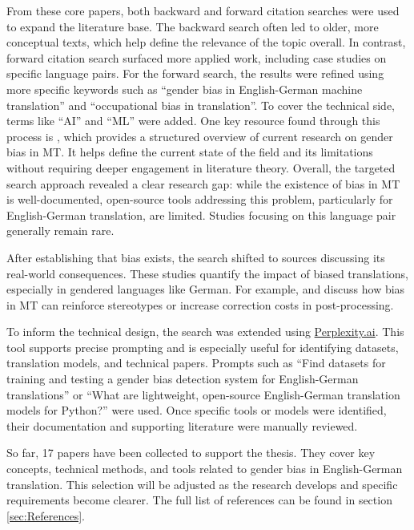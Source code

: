 \documentclass[oneside, paper=A4, DIV=15]{scrartcl}
\begin{document}
\begin{description}
From these core papers, both backward and forward citation searches were used to expand the literature base. The backward search often led to older, more conceptual texts, which help define the relevance of the topic overall. In contrast, forward citation search surfaced more applied work, including case studies on specific language pairs. For the forward search, the results were refined using more specific keywords such as “gender bias in English-German machine translation” and “occupational bias in translation”. To cover the technical side, terms like “AI” and “ML” were added. One key resource found through this process is \textcite{shrestha_exploring_2022}, which provides a structured overview of current research on gender bias in MT. It helps define the current state of the field and its limitations without requiring deeper engagement in literature theory. Overall, the targeted search approach revealed a clear research gap: while the existence of bias in MT is well-documented, open-source tools addressing this problem, particularly for English-German translation, are limited. Studies focusing on this language pair generally remain rare.

After establishing that bias exists, the search shifted to sources discussing its real-world consequences. These studies quantify the impact of biased translations, especially in gendered languages like German. For example, \textcite{savoldi_what_2024} and \textcite{bolukbasi_man_2016} discuss how bias in MT can reinforce stereotypes or increase correction costs in post-processing.

To inform the technical design, the search was extended using \href{https://www.perplexity.ai/}{Perplexity.ai}. This tool supports precise prompting and is especially useful for identifying datasets, translation models, and technical papers. Prompts such as “Find datasets for training and testing a gender bias detection system for English-German translations” or “What are lightweight, open-source English-German translation models for Python?” were used. Once specific tools or models were identified, their documentation and supporting literature were manually reviewed.

So far, 17 papers have been collected to support the thesis. They cover key concepts, technical methods, and tools related to gender bias in English-German translation. This selection will be adjusted as the research develops and specific requirements become clearer. The full list of references can be found in section \ref{sec:References}.


\end{description}
\end{document}
